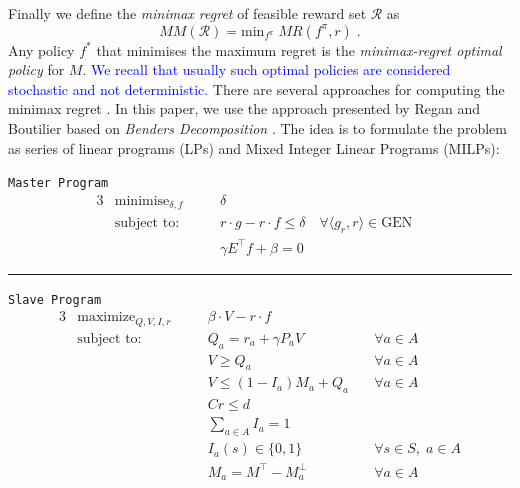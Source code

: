 \documentclass[runningheads,a4paper]{llncs}
\newcommand{\ET}[1]{{\textcolor{blue}{#1}}}
\begin{document}
Finally we define the \textit{minimax regret} of feasible reward set $\mathcal{R}$ as
$$MM(\mathcal{R}) = \text{min}_{f^{\pi}}\; MR(f^{\pi}, r)\;.$$
Any policy $f^*$  that minimises the maximum regret is the \textit{minimax-regret optimal policy} for $M$. 
\ET{We recall that usually such optimal policies are considered stochastic and not deterministic.}
There are several approaches for computing the minimax regret \cite{alizadeh2015,benavent2018,Regan2009,daSilva2011,Xu2009}. 
In this paper, we use the approach presented by Regan and Boutilier \citep{Regan2009} based on \textit{Benders Decomposition} \cite{Benders1962}.
 The idea is to formulate the problem as series of linear programs (LPs) and Mixed Integer Linear Programs (MILPs):


\begin{center}\label{minimax}
\texttt{Master Program}
\begin{alignat}{3}
&\text{minimise}_{\delta, f} && \delta & \\
&\text{subject to:}&\quad& r\cdot g - r \cdot f \leq \delta \quad \forall \langle g_r, r \rangle \in \text{GEN}\label{delta_cut}\\
&& \quad& \gamma E^{\top} f + \beta = 0 
\end{alignat}
\begin{center}
\noindent\rule{8cm}{0.4pt}
\end{center} 
\texttt{Slave Program}
\begin{alignat}{3}
&\text{maximize}_{Q, V, I, r} && \beta \cdot V - r \cdot f \\
&\text{subject to:} &\quad& Q_a = r_a + \gamma P_aV &\quad \forall a \in A\\
&& \quad& V \geq Q_a  &\quad \forall a \in A\\
&& \quad& V \leq (1-I_a)M_a + Q_a  &\quad \forall a \in A\\
&& \quad& Cr \leq d \\
&& \quad& \sum_{a \in A} I_a = 1  \label{eq:sum_I}\\
&& \quad& I_a(s) \in \{0, 1 \} &\quad \forall s \in S, \; a \in A \label{eq:bin_I}\\
&& \quad& M_a = M^{\top} - M_a^{\perp} &\quad \forall a \in A
\end{alignat}
\end{center}
\end{document}
